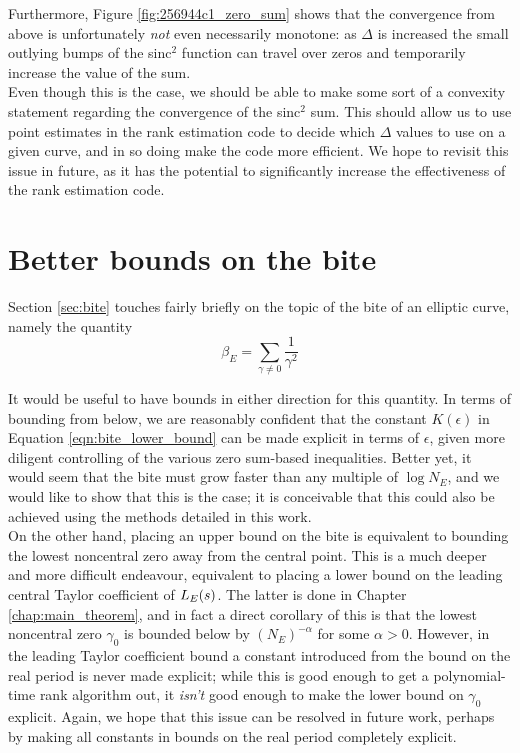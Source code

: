 Furthermore, Figure \ref{fig:256944c1_zero_sum} shows that the convergence from above is unfortunately {\it not} even necessarily monotone: as $\Delta$ is increased the small outlying bumps of the sinc$^2$ function can travel over zeros and temporarily increase the value of the sum. \\

Even though this is the case, we should be able to make some sort of a convexity statement regarding the convergence of the sinc$^2$ sum. This should allow us to use point estimates in the rank estimation code to decide which $\Delta$ values to use on a given curve, and in so doing make the code more efficient. We hope to revisit this issue in future, as it has the potential to significantly increase the effectiveness of the rank estimation code.

\section{Better bounds on the bite}

Section \ref{sec:bite} touches fairly briefly on the topic of the bite of an elliptic curve, namely the quantity
\begin{equation}
\beta_E = \sum_{\gamma \ne 0} \frac{1}{\gamma^2}
\end{equation}

It would be useful to have bounds in either direction for this quantity. In terms of bounding from below, we are reasonably confident that the constant $K(\epsilon)$ in Equation \ref{eqn:bite_lower_bound} can be made explicit in terms of $\epsilon$, given more diligent controlling of the various zero sum-based inequalities. Better yet, it would seem that the bite must grow faster than any multiple of $\log N_E$, and we would like to show that this is the case; it is conceivable that this could also be achieved using the methods detailed in this work. \\

On the other hand, placing an upper bound on the bite is equivalent to bounding the lowest noncentral zero away from the central point. This is a much deeper and more difficult endeavour, equivalent to placing a lower bound on the leading central Taylor coefficient of $L_E(s)$. The latter is done in Chapter \ref{chap:main_theorem}, and in fact a direct corollary of this is that the lowest noncentral zero $\gamma_0$ is bounded below by $(N_E)^{-\alpha}$ for some $\alpha>0$. However, in the leading Taylor coefficient bound a constant introduced from the bound on the real period is never made explicit; while this is good enough to get a polynomial-time rank algorithm out, it {\it isn't} good enough to make the lower bound on $\gamma_0$ explicit. Again, we hope that this issue can be resolved in future work, perhaps by making all constants in bounds on the real period completely explicit.


